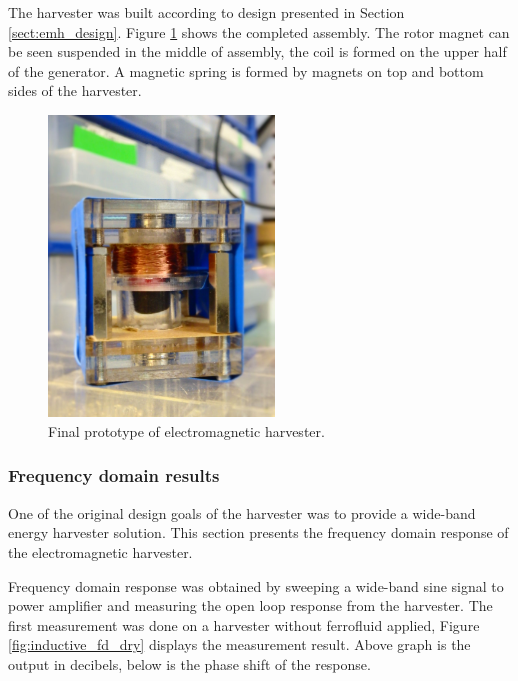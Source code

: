The harvester was built according to design presented in Section \ref{sect:emh_design}. Figure \ref{fig:emh_final} shows the completed assembly. The rotor magnet can be seen suspended in the middle of assembly, the coil is formed on the upper half of the generator. A magnetic spring is formed by magnets on top and bottom sides of the harvester. 

\begin{figure}[htb]
\begin{center}
\includegraphics[height=8cm]{images/own_pic/inductive_harvester.jpg}
\end{center}
\caption{\label{fig:emh_final} Final prototype of electromagnetic harvester.}
\end{figure}

\subsubsection{Frequency domain results} \label{sect:emh_fd}
One of the original design goals of the harvester was to provide a wide-band energy harvester solution. This section presents the frequency domain response of the electromagnetic harvester.

Frequency domain response was obtained by sweeping a wide-band sine signal to power amplifier and measuring the open loop response from the harvester. The first measurement was done on a harvester without ferrofluid applied, Figure \ref{fig:inductive_fd_dry} displays the measurement result. Above graph is the output in decibels, below is the phase shift of the response.

